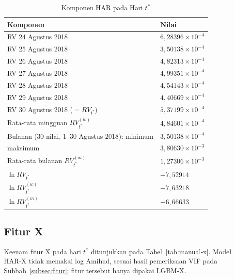 \begin{table}[htbp]
  \caption{Komponen HAR pada Hari $t^*$}
  \label{tab:manual-har}
  \centering
  \begingroup
  \small
  \begin{tabular}{|l|l|}
    \hline
    \textbf{Komponen} & \textbf{Nilai} \\
    \hline
    RV 24 Agustus 2018 & $6{,}28396 \times 10^{-4}$ \\
    \hline
    RV 25 Agustus 2018 & $3{,}50138 \times 10^{-4}$ \\
    \hline
    RV 26 Agustus 2018 & $4{,}82313 \times 10^{-4}$ \\
    \hline
    RV 27 Agustus 2018 & $4{,}99351 \times 10^{-4}$ \\
    \hline
    RV 28 Agustus 2018 & $4{,}54143 \times 10^{-4}$ \\
    \hline
    RV 29 Agustus 2018 & $4{,}40669 \times 10^{-4}$ \\
    \hline
    RV 30 Agustus 2018 ($=RV_{t^*}$) & $5{,}37199 \times 10^{-4}$ \\
    \hline
    Rata-rata mingguan $RV^{(w)}_{t^*}$ & $4{,}84601 \times 10^{-4}$ \\
    \hline
    Bulanan (30 nilai, 1--30 Agustus 2018): minimum &
      $3{,}50138 \times 10^{-4}$ \\
    \hline
    \phantom{Bulanan (30 nilai, 1--30 Agustus 2018): }maksimum &
      $3{,}80630 \times 10^{-3}$ \\
    \hline
    Rata-rata bulanan $RV^{(m)}_{t^*}$ & $1{,}27306 \times 10^{-3}$ \\
    \hline
    $\ln RV_{t^*}$ & $-7{,}52914$ \\
    \hline
    $\ln RV^{(w)}_{t^*}$ & $-7{,}63218$ \\
    \hline
    $\ln RV^{(m)}_{t^*}$ & $-6{,}66633$ \\
    \hline
  \end{tabular}
  \endgroup
\end{table}

\subsection{Fitur X}
Keenam fitur X pada hari $t^*$ ditunjukkan pada Tabel~\ref{tab:manual-x}.
Model HAR-X tidak memakai log Amihud, sesuai hasil pemeriksaan VIF pada
Subbab~\ref{subsec:fitur}; fitur tersebut hanya dipakai LGBM-X.

